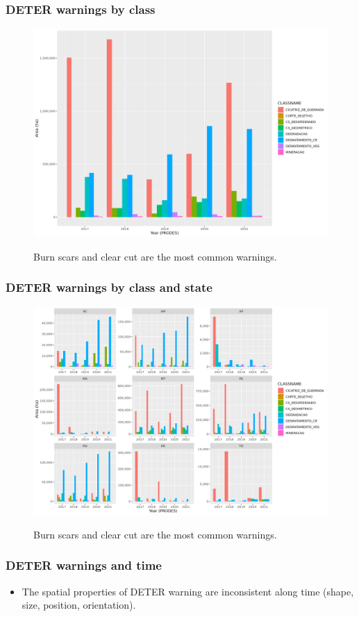 \documentclass[aspectratio=169]{beamer}
\begin{document}
\begin{frame}
    \frametitle{DETER warnings by class}
    \begin{figure}[h]
        \includegraphics[width=0.65\linewidth]
        {figures/plot_deter_area_by_class.png}
        \label{fig:deter_area_by_class}
        \caption{Burn scars and clear cut are the most common warnings.}
    \end{figure}
\end{frame}

\begin{frame}
    \frametitle{DETER warnings by class and state}
    \begin{figure}[h]
        \includegraphics[width=0.65\linewidth]
        {./figures/plot_deter_area_by_class_state.png}
        \label{fig:deter_area_by_class_state}
        \caption{Burn scars and clear cut are the most common warnings.}
    \end{figure}
\end{frame}

\begin{frame}
    \frametitle{DETER warnings and time}
    \begin{itemize}
        \item The spatial properties of DETER warning are inconsistent along 
            time (shape, size, position, orientation).
    \end{itemize}
\end{frame}
\end{document}
